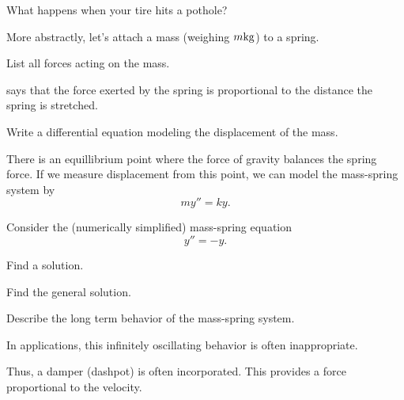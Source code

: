 
\begin{applicationActivities}

\begin{observation}
What happens when your tire hits a pothole?



\end{observation}

\begin{activity}{5}
More abstractly, let's attach a mass (weighing \(m {\rm kg}\)) to a spring.

List all forces acting on the mass.
\end{activity}

\begin{activity}{5}
 says that the force exerted by the spring is proportional to the distance the spring is stretched.

Write a differential equation modeling the displacement of the mass.
\end{activity}

\begin{observation}
There is an equillibrium point where the force of gravity balances the spring force.  If we measure displacement from this point, we can model the mass-spring system by
\[my''=ky.\]
\end{observation}

\begin{activity}{15}
Consider the (numerically simplified) mass-spring equation \[y''=-y.\]
\begin{subactivity}
Find a solution.
\end{subactivity}
\begin{subactivity}
Find the general solution.
\end{subactivity}
\begin{subactivity}
Describe the long term behavior of the mass-spring system.
\end{subactivity}
\end{activity}

\begin{activity}{5}
In applications, this infinitely oscillating behavior is often inappropriate.

Thus, a damper (dashpot) is often incorporated.  This provides a force proportional to the velocity.


\end{activity}
\end{applicationActivities}
